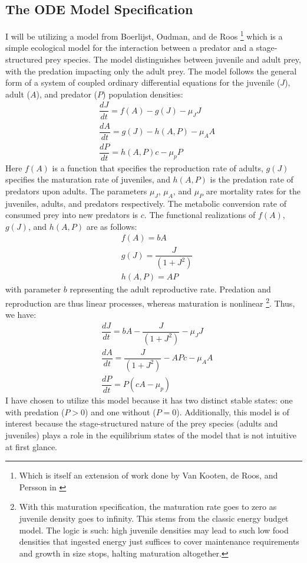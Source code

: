 \documentclass[12pt]{article}
\begin{document}
\subsection{The ODE Model Specification}
I will be utilizing a model from Boerlijst, Oudman, and de Roos \cite{Boerlijst2013} \footnote{Which is itself an extension of work done by Van Kooten, de Roos, and Persson in \cite{VanKooten2005}} which is a simple ecological model for the interaction between a predator and a stage-structured prey species. The model distinguishes between juvenile and adult prey, with the predation impacting only the adult prey. The model follows the general form of a system of coupled ordinary differential equations for the juvenile ($J$), adult ($A$), and predator ($P$) population densities:
\begin{align}
	& \dfrac{dJ}{dt} = f(A) - g(J) - \mu_JJ\\
	& \dfrac{dA}{dt} = g(J) - h(A,P) - \mu_AA\\
	& \dfrac{dP}{dt} = h(A,P)c - \mu_pP
\end{align}
Here $f(A)$ is a function that specifies the reproduction rate of
adults, $g(J)$ specifies the maturation rate of juveniles, and $h(A,P)$ is the predation rate of predators upon adults. The parameters $\mu_J$, $\mu_A$, and $\mu_P$ are mortality rates for the juveniles, adults, and predators respectively. The metabolic conversion rate of consumed prey into new predators is $c$. The functional realizations of $f(A)$, $g(J)$, and $h(A,P)$ are as follows:
\begin{align}
	& f(A) = bA\\
	& g(J) = \dfrac{J}{(1+J^2)}\\
	& h(A,P) = AP
\end{align}
with parameter $b$ representing the adult reproductive rate. Predation and reproduction are thus linear processes, whereas maturation is nonlinear \footnote{With this maturation specification, the maturation rate goes to zero as juvenile density goes to infinity. This stems from the classic energy budget model. The logic is such: high juvenile densities may lead to such low food densities that ingested energy just suffices to cover maintenance requirements and growth in size stops, halting maturation altogether.}. Thus, we have:
\begin{align}
	& \dfrac{dJ}{dt} = bA - \dfrac{J}{(1+J^2)} - \mu_JJ\\
	& \dfrac{dA}{dt} = \dfrac{J}{(1+J^2)} - APc - \mu_AA\\
	& \dfrac{dP}{dt} = P(cA - \mu_p)
\end{align}
I have chosen to utilize this model because it has two distinct stable states: one with predation ($P>0$) and one without ($P=0$). Additionally, this model is of interest because the stage-structured nature of the prey species (adults and juveniles) plays a role in the equilibrium states of the model that is not intuitive at first glance.\\
\end{document}
